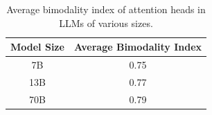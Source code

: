 \begin{table}[h]






\centering






\begin{tabular}{|c|c|}






\hline






\textbf{Model Size} & \textbf{Average Bimodality Index} \\






\hline






7B & 0.75 \\






\hline






13B & 0.77 \\






\hline






70B & 0.79 \\






\hline






\end{tabular}






\caption{Average bimodality index of attention heads in LLMs of various sizes.}






\label{tab:bimodality-index}






\end{table}













